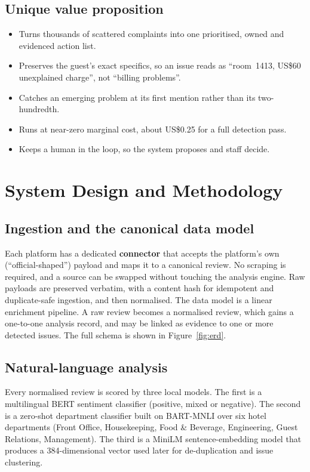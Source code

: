 \documentclass[11pt,a4paper]{article}
\begin{document}
\subsection{Unique value proposition}
\begin{itemize}
  \item Turns thousands of scattered complaints into one prioritised, owned and evidenced action list.
  \item Preserves the guest's exact specifics, so an issue reads as ``room~1413, US\$60 unexplained
        charge'', not ``billing problems''.
  \item Catches an emerging problem at its first mention rather than its two-hundredth.
  \item Runs at near-zero marginal cost, about US\$0.25 for a full detection pass.
  \item Keeps a human in the loop, so the system proposes and staff decide.
\end{itemize}

\section{System Design and Methodology}
\label{sec:design}

\subsection{Ingestion and the canonical data model}
Each platform has a dedicated \textbf{connector} that accepts the platform's own (``official-shaped'')
payload and maps it to a canonical review. No scraping is required, and a source can be swapped without
touching the analysis engine. Raw payloads are preserved verbatim, with a content hash for idempotent
and duplicate-safe ingestion, and then normalised. The data model is a linear enrichment pipeline. A raw
review becomes a normalised review, which gains a one-to-one analysis record, and may be linked as
evidence to one or more detected issues. The full schema is shown in Figure~\ref{fig:erd}.

\subsection{Natural-language analysis}
Every normalised review is scored by three local models. The first is a multilingual BERT sentiment
classifier (positive, mixed or negative). The second is a zero-shot department classifier built on
BART-MNLI \citep{lewis2020bart} over six hotel departments (Front Office, Housekeeping, Food \&
Beverage, Engineering, Guest Relations, Management). The third is a MiniLM sentence-embedding model
\citep{reimers2019sbert} that produces a 384-dimensional vector used later for de-duplication and issue
clustering.
\end{document}
